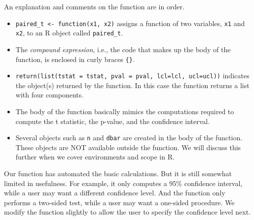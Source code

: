 \documentclass[
]{krantz}
\providecommand{\tightlist}{%
  \setlength{\itemsep}{0pt}\setlength{\parskip}{0pt}}
\begin{document}
An explanation and comments on the function are in order.

\begin{itemize}
\tightlist
\item
  \texttt{paired\_t\ \textless{}-\ function(x1,\ x2)} assigns a function of two variables, \texttt{x1} and \texttt{x2}, to an R object called \texttt{paired\_t}.
\item
  The \emph{compound expression}, i.e., the code that makes up the body of the function, is enclosed in curly braces \texttt{\{\}}.
\item
  \texttt{return(list(tstat\ =\ tstat,\ pval\ =\ pval,\ lcl=lcl,\ ucl=ucl))} indicates the object(s) returned by the function. In this case the function returns a list with four components.
\item
  The body of the function basically mimics the computations required to compute the t statistic, the p-value, and the confidence interval.
\item
  Several objects such as \texttt{n} and \texttt{dbar} are created in the body of the function. These objects are NOT available outside the function. We will discuss this further when we cover environments and scope in R.
\end{itemize}

Our function has automated the basic calculations. But it is still somewhat limited in usefulness. For example, it only computes a 95\% confidence interval, while a user may want a different confidence level. And the function only performs a two-sided test, while a user may want a one-sided procedure. We modify the function slightly to allow the user to specify the confidence level next.
\end{document}
